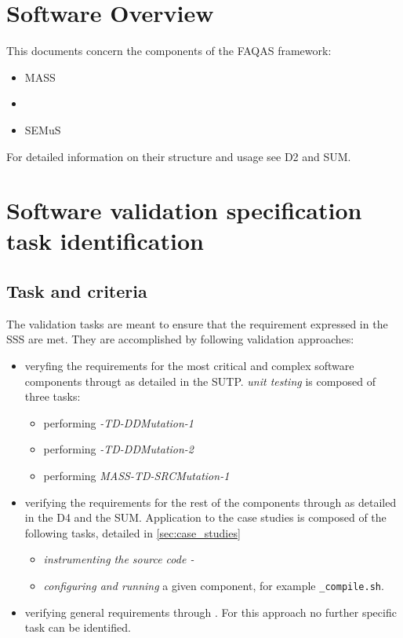 \chapter{Software Overview}

This documents concern the components of the FAQAS framework:
\begin{itemize}
  \item MASS
  \item \DAMA
  \item SEMuS
\end{itemize}

For detailed information on their structure and usage see D2 and SUM.

\chapter{Software validation specification task identification}

\section{Task and criteria}
\label{sec:taskCrit}

The validation tasks are meant to ensure that the requirement expressed in the SSS are met.
They are accomplished by following validation approaches:
\begin{itemize}
  \item veryfing the requirements for the most critical and complex software components througt  as detailed in the SUTP.
  \emph{unit testing} is composed of three tasks:
  \begin{itemize}
    \item performing \emph{\DAMA-TD-DDMutation-1}
    \item performing \emph{\DAMA-TD-DDMutation-2}
    \item performing \emph{MASS-TD-SRCMutation-1}
  \end{itemize}
  \item verifying the requirements for the rest of the components through  as detailed in the D4 and the SUM.
  Application to the case studies is composed of the following tasks, detailed in \ref{sec:case_studies}
  \begin{itemize}
    \item \emph{instrumenting the source code - \DAMA}
    \item \emph{configuring and running} a given component, for example \texttt{\DAMA\_compile.sh}.
  \end{itemize}
  \item verifying general requirements through . For this approach no further specific task can be identified.
\end{itemize}

